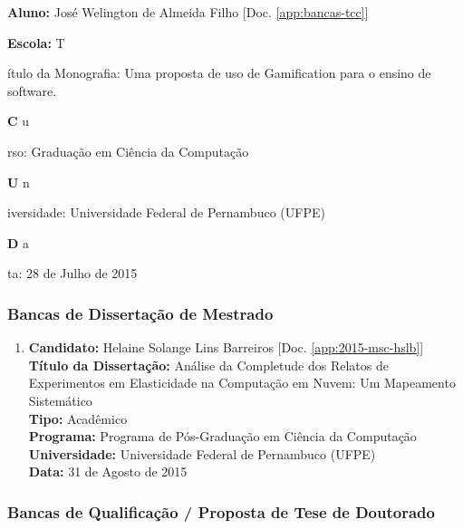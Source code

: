 \documentclass[a4paper,oneside,12pt]{article}
\newcommand{\SubItemB}[2]{
    {\setlength\itemindent{15pt} \item[-] \textbf{#1} {#2}}}
\newcommand{\SubItemBB}[1]{
    {\setlength\itemindent{15pt} \item[-] \textbf{Escola: } #1}}
\begin{document}
\begin{enumerate}
\renewcommand{\labelenumi}{{\large\bfseries\arabic{enumi}.}}
\vspace{0.3cm}

\item       \textbf{Aluno:} José Welington de Almeida Filho [Doc. \ref{app:bancas-tcc}]
    \SubItemBB  Título da Monografia: Uma proposta de uso de Gamification para o ensino de software.
    \SubItemB  Curso: Graduação em Ciência da Computação\\
           \SubItemB Universidade: Universidade Federal de Pernambuco (UFPE)
           \SubItemB  Data: 28 de Julho de 2015\\

\end{enumerate}


\subsubsection{Bancas de Dissertação de Mestrado}
\vspace{0.3cm}

\begin{enumerate}
\renewcommand{\labelenumi}{{\large\bfseries\arabic{enumi}.}}
\vspace{0.3cm}

\item       \textbf{Candidato:} Helaine Solange Lins Barreiros [Doc. \ref{app:2015-msc-hslb}] \\
            \textbf{Título da Dissertação:} Análise da Completude dos Relatos de Experimentos em Elasticidade na Computação em Nuvem: Um Mapeamento Sistemático\\
            \textbf{Tipo:} Acadêmico\\
            \textbf{Programa:} Programa de Pós-Graduação em Ciência da Computação\\
            \textbf{Universidade:} Universidade Federal de Pernambuco (UFPE)\\
            \textbf{Data:} 31 de Agosto de 2015

\end{enumerate}


\subsubsection{Bancas de Qualificaç\~ao / Proposta de Tese de Doutorado}
\vspace{0.3cm}
\end{document}
